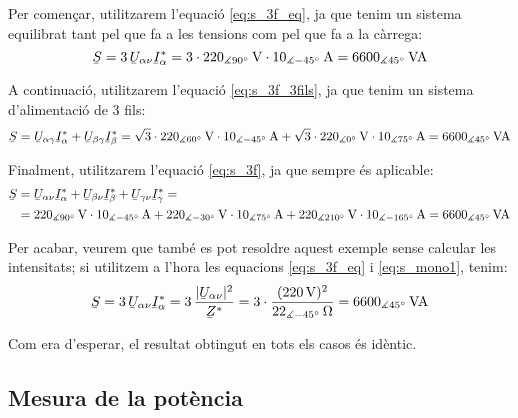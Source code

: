 \begin{exemple}
    Per comen\c{c}ar,  utilitzarem l'equaci\'{o} \eqref{eq:s_3f_eq}, ja que tenim
    un sistema equilibrat tant pel que fa a les tensions com pel que fa a la c\`{a}rrega:
    \[
    \cmplx{S} = 3\,\cmplx{U}_{\alpha\nu} \cmplx{I}_\alpha^* =
    3\cdot 220_{\measuredangle 90\degree}\unit{V} \cdot
    10_{\measuredangle -45\degree}\unit{A} = 6600_{\measuredangle 45\degree}\unit{VA}
    \]

    A continuaci\'{o},  utilitzarem l'equaci\'{o} \eqref{eq:s_3f_3fils}, ja que tenim
    un sistema d'alimentaci\'{o} de 3 fils:
    \[
    \cmplx{S} = \cmplx{U}_{\alpha\gamma} \cmplx{I}_\alpha^*
     +  \cmplx{U}_{\beta\gamma} \cmplx{I}_\beta^* =
    \sqrt{3}\cdot220_{\measuredangle 60\degree}\unit{V} \cdot
    10_{\measuredangle -45\degree}\unit{A} + \sqrt{3}\cdot220_{\measuredangle 0\degree}\unit{V}
    \cdot 10_{\measuredangle 75\degree}\unit{A}  = 6600_{\measuredangle 45\degree}\unit{VA}
    \]

     Finalment,  utilitzarem l'equaci\'{o} \eqref{eq:s_3f}, ja que
     sempre \'{e}s aplicable:
     \[\begin{split}
     \cmplx{S} &=  \cmplx{U}_{\alpha\nu} \cmplx{I}_\alpha^* +
     \cmplx{U}_{\beta\nu} \cmplx{I}_\beta^* +  \cmplx{U}_{\gamma\nu}
     \cmplx{I}_\gamma^* =\\
     &= 220_{\measuredangle 90\degree}\unit{V}
     \cdot 10_{\measuredangle -45\degree}\unit{A} + 220_{\measuredangle
     -30\degree}\unit{V} \cdot 10_{\measuredangle 75\degree}\unit{A}
     + 220_{\measuredangle 210\degree}\unit{V} \cdot 10_{\measuredangle
     -165\degree}\unit{A} =6600_{\measuredangle 45\degree}\unit{VA}
     \end{split} \]

    Per acabar, veurem que tamb\'{e} es pot resoldre aquest exemple
    sense calcular les intensitats; si utilitzem a l'hora les
    equacions \eqref{eq:s_3f_eq} i \eqref{eq:s_mono1}, tenim:
    \[
    \cmplx{S} = 3\,\cmplx{U}_{\alpha\nu} \cmplx{I}_\alpha^* = 3\,
    \frac{|\cmplx{U}_{\alpha\nu}|^2}{\cmplx{Z}^*} =
    3\cdot\frac{(220\unit{V})^2}{22_{\measuredangle
    -45\degree}\unit{\ohm}} = 6600_{\measuredangle 45\degree}\unit{VA}
    \]

    Com era d'esperar, el resultat obtingut en tots els casos
    \'{e}s id\`{e}ntic.
\end{exemple}

\subsection{Mesura de la pot\`{e}ncia}

